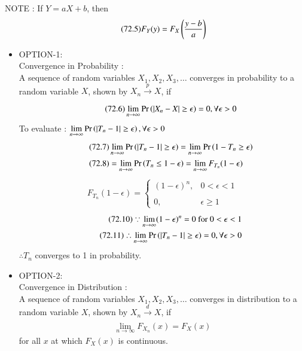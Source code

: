 \documentclass[journal,12pt,twocolumn]{IEEEtran}
\begin{document}
NOTE : If $Y=aX+b$, then
\begin{align}
\tag{72.5}
\label{eq:form}
    F_{Y}(y)=F_{X}\left(\dfrac{y-b}{a}\right)
\end{align}
\begin{itemize}
\item OPTION-1:\\
Convergence in Probability :\\
A sequence of random variables $X_{1},X_{2},X_{3},\dots$ converges in probability to a random variable $X$, shown by $X_{n}\xrightarrow[]{p}X$, if
\begin{align}
\tag{72.6}
    \displaystyle\lim_{n\to\infty}\Pr\left(|X_{n}-X|\geq\epsilon\right)=0,\forall\epsilon>0
\end{align}
To evaluate : $\displaystyle\lim_{n\to\infty}\Pr\left(|T_{n}-1|\geq\epsilon\right),\forall\epsilon>0$
\begin{align}
\tag{72.7}
    &\displaystyle\lim_{n\to\infty}\Pr\left(|T_{n}-1|\geq\epsilon\right)=\displaystyle\lim_{n\to\infty}\Pr\left(1-T_{n}\geq\epsilon\right)\\
\tag{72.8}
    &=\displaystyle\lim_{n\to\infty}\Pr\left(T_{n}\leq1-\epsilon\right)=\displaystyle\lim_{n\to\infty}F_{T_{n}}(1-\epsilon)
\end{align}
\begin{align}
\tag{72.9}
    F_{T_{n}}(1-\epsilon)=\begin{cases}
	(1-\epsilon)^{n}, & 0< \epsilon<1 \\~\\[-1em]
	0, & \epsilon\geq 1
	\end{cases}
\end{align}
\begin{align}
\tag{72.10}
    \because\displaystyle\lim_{n\to\infty}(1-\epsilon)^{n}=0 \text{ for } 0< \epsilon<1\\
    \tag{72.11}
    \therefore \displaystyle\lim_{n\to\infty}\Pr\left(|T_{n}-1|\geq\epsilon\right)=0,\forall\epsilon>0
\end{align}
$\therefore T_{n}$ converges to 1 in probability.
\item OPTION-2:\\
Convergence in Distribution :\\
A sequence of random variables $X_{1},X_{2},X_{3},\dots$ converges in distribution to a random variable $X$, shown by $X_{n}\xrightarrow[]{d}X$, if
\begin{align}
\tag{72.12}
    \displaystyle\lim_{n\to\infty}F_{X_{n}}(x)=F_{X}(x)
\end{align}
for all $x$ at which $F_{X}(x)$ is continuous.\\

\end{itemize}
\end{document}
